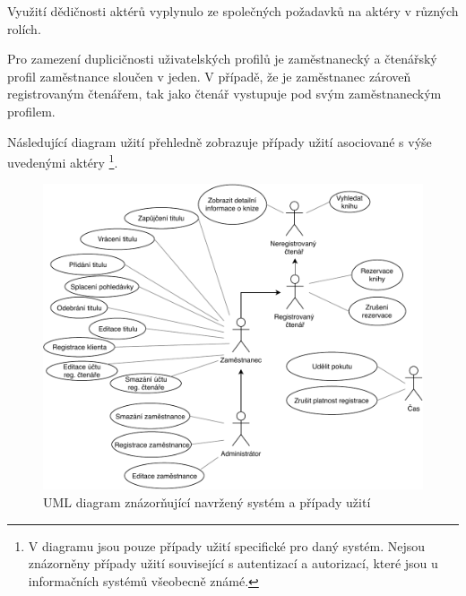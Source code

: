 \documentclass[11pt, a4paper, titlepage]{article}
\begin{document}
	\noindent Využití dědičnosti aktérů vyplynulo ze společných požadavků na aktéry v různých
	rolích.

	Pro zamezení duplicičnosti uživatelských profilů je zaměstnanecký a čtenářský profil 
	zaměstnance sloučen v jeden. V případě, že je zaměstnanec zároveň registrovaným čtenářem,
	tak jako čtenář vystupuje pod svým zaměstnaneckým profilem.

	\newpage

	Následující diagram užití přehledně zobrazuje případy užití asociované s výše uvedenými aktéry	
	\footnote{V diagramu jsou pouze případy užití specifické pro daný systém. Nejsou znázorněny
	případy užití související s autentizací a autorizací, které jsou u informačních systémů
	všeobecně známé.}.
	
	\begin{figure}[H]
		
		\centering
		\includegraphics[width=1.0\textwidth, angle=0]{./assets/usecase/full.pdf}
		\caption{UML diagram znázorňující navržený systém a případy užití}

	\end{figure}
\end{document}

